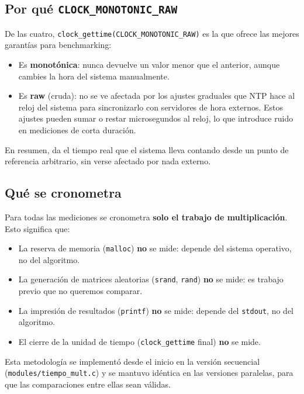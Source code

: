 \subsection{Por qué \texttt{CLOCK\_MONOTONIC\_RAW}}

De las cuatro, \texttt{clock\_gettime(CLOCK\_MONOTONIC\_RAW)} es la que ofrece las mejores garantías para benchmarking:

\begin{itemize}
    \item Es \textbf{monotónica}: nunca devuelve un valor menor que el anterior, aunque cambies la hora del sistema manualmente.
    \item Es \textbf{raw} (cruda): no se ve afectada por los ajustes graduales que NTP hace al reloj del sistema para sincronizarlo con servidores de hora externos. Estos ajustes pueden sumar o restar microsegundos al reloj, lo que introduce ruido en mediciones de corta duración.
\end{itemize}

En resumen, da el tiempo real que el sistema lleva contando desde un punto de referencia arbitrario, sin verse afectado por nada externo.

\subsection{Qué se cronometra}

Para todas las mediciones se cronometra \textbf{solo el trabajo de multiplicación}. Esto significa que:

\begin{itemize}
    \item La reserva de memoria (\texttt{malloc}) \textbf{no} se mide: depende del sistema operativo, no del algoritmo.
    \item La generación de matrices aleatorias (\texttt{srand}, \texttt{rand}) \textbf{no} se mide: es trabajo previo que no queremos comparar.
    \item La impresión de resultados (\texttt{printf}) \textbf{no} se mide: depende del \texttt{stdout}, no del algoritmo.
    \item El cierre de la unidad de tiempo (\texttt{clock\_gettime} final) \textbf{no} se mide.
\end{itemize}

Esta metodología se implementó desde el inicio en la versión secuencial (\texttt{modules/tiempo\_mult.c}) y se mantuvo idéntica en las versiones paralelas, para que las comparaciones entre ellas sean válidas.

